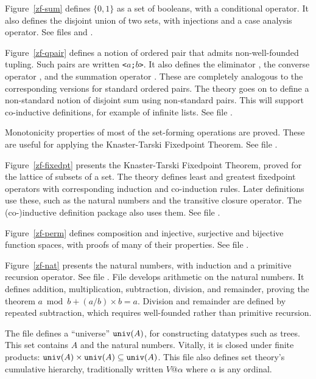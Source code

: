 Figure~\ref{zf-sum} defines $\{0,1\}$ as a set of booleans, with a
conditional operator.  It also defines the disjoint union of two sets, with
injections and a case analysis operator.  See files
 and .

Figure~\ref{zf-qpair} defines a notion of ordered pair that admits
non-well-founded tupling.  Such pairs are written {\tt<$a$;$b$>}.  It also
defines the eliminator , the converse operator
, and the summation operator .
These are completely analogous to the corresponding versions for standard
ordered pairs.  The theory goes on to define a non-standard notion of
disjoint sum using non-standard pairs.  This will support co-inductive
definitions, for example of infinite lists.  See file .

Monotonicity properties of most of the set-forming operations are proved.
These are useful for applying the Knaster-Tarski Fixedpoint Theorem.
See file .

Figure~\ref{zf-fixedpt} presents the Knaster-Tarski Fixedpoint Theorem, proved
for the lattice of subsets of a set.  The theory defines least and greatest
fixedpoint operators with corresponding induction and co-induction rules.
Later definitions use these, such as the natural numbers and
the transitive closure operator.  The (co-)inductive definition
package also uses them.    See file .

Figure~\ref{zf-perm} defines composition and injective, surjective and
bijective function spaces, with proofs of many of their properties.
See file .

Figure~\ref{zf-nat} presents the natural numbers, with induction and a
primitive recursion operator.  See file .  File
 develops arithmetic on the natural numbers.  It
defines addition, multiplication, subtraction, division, and remainder,
proving the theorem $a \bmod b + (a/b)\times b = a$.  Division and
remainder are defined by repeated subtraction, which requires well-founded
rather than primitive recursion.

The file  defines a ``universe'' ${\tt univ}(A)$,
for constructing datatypes such as trees.  This set contains $A$ and the
natural numbers.  Vitally, it is closed under finite products: ${\tt
  univ}(A)\times{\tt univ}(A)\subseteq{\tt univ}(A)$.  This file also
defines set theory's cumulative hierarchy, traditionally written $V@\alpha$
where $\alpha$ is any ordinal.


